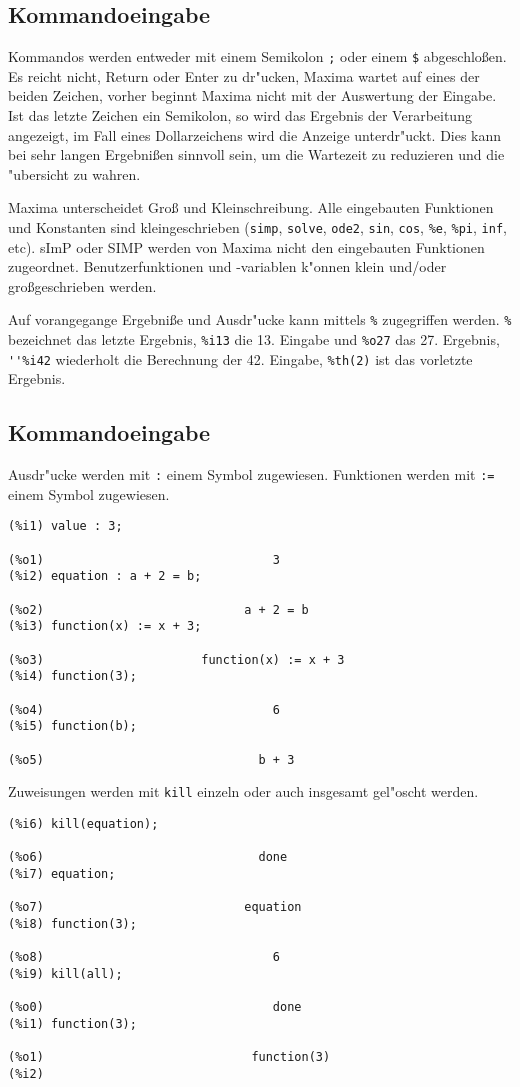 \documentclass[spanish,12pt,a4paper]{article}
\begin{document}
\subsection{Kommandoeingabe}

Kommandos werden entweder mit einem Semikolon  \verb|;|  oder einem  \verb|$| abgeschlo{\ss}en. Es reicht nicht, Return oder Enter zu dr"ucken, Maxima wartet auf eines der beiden Zeichen, vorher beginnt Maxima nicht mit der Auswertung der Eingabe. Ist das letzte Zeichen ein Semikolon, so wird das Ergebnis der Verarbeitung angezeigt, im Fall eines Dollarzeichens wird die Anzeige unterdr"uckt. Dies kann bei sehr langen Ergebni{\ss}en sinnvoll sein, um die Wartezeit zu reduzieren und die "ubersicht zu wahren.

Maxima unterscheidet Gro{\ss} und Kleinschreibung. Alle eingebauten Funktionen und Konstanten sind kleingeschrieben (\verb|simp|, \verb|solve|, \verb|ode2|, \verb|sin|, \verb|cos|, \verb|%e|, \verb|%pi|, \verb|inf|, etc). sImP oder SIMP werden von Maxima nicht den eingebauten Funktionen zugeordnet. Benutzerfunktionen und -variablen k"onnen klein und/oder gro{\ss}geschrieben werden.

Auf vorangegange Ergebni{\ss}e und Ausdr"ucke kann mittels \verb|%| zugegriffen werden. \verb|%| bezeichnet das letzte Ergebnis, \verb|%i13| die 13. Eingabe und \verb|%o27| das 27. Ergebnis, \verb|''%i42| wiederholt die Berechnung der 42. Eingabe, \verb|%th(2)| ist das vorletzte Ergebnis.

\subsection{Kommandoeingabe}

Ausdr"ucke werden mit \verb|:| einem Symbol zugewiesen. Funktionen werden mit \verb|:=| einem Symbol zugewiesen.

\scriptsize
\begin{verbatim}
(%i1) value : 3;

(%o1)                                3
(%i2) equation : a + 2 = b;

(%o2)                            a + 2 = b
(%i3) function(x) := x + 3;

(%o3)                      function(x) := x + 3
(%i4) function(3);

(%o4)                                6
(%i5) function(b);

(%o5)                              b + 3
\end{verbatim}
\normalsize
Zuweisungen werden mit \verb|kill| einzeln oder auch insgesamt gel"oscht werden.
\scriptsize
\begin{verbatim}
(%i6) kill(equation);

(%o6)                              done
(%i7) equation;

(%o7)                            equation
(%i8) function(3);

(%o8)                                6
(%i9) kill(all);

(%o0)                                done
(%i1) function(3);

(%o1)                             function(3)
(%i2) 
\end{verbatim}
\normalsize
\end{document}

